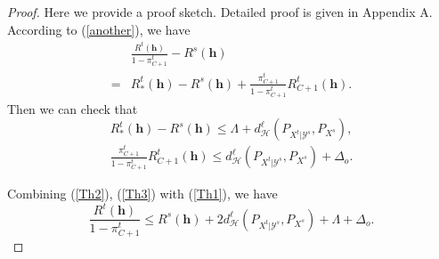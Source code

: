 \documentclass[journal]{IEEEtran}
\begin{document}
\begin{proof}
{Here we provide a proof sketch. Detailed proof is given in Appendix A.} {According to} (\ref{another}), {we have}
\begin{equation}\label{Th1}
\begin{split}
    &\frac{R^t({\bm h})}{1-\pi_{C+1}^t}-R^s({\bm h})\\=&R^t_*({\bm h})-R^s({\bm h})+\frac{\pi_{C+1}^t}{1-\pi_{C+1}^t}R^t_{C+1}({\bm h}).
\end{split}
\end{equation}
{Then we can check that }
\begin{equation}\label{Th2}
   R^t_{*}({\bm h})-R^s({\bm h})\leq\Lambda +d_{\mathcal{H}}^{\ell}(P_{X^t|\mathcal{Y}^s},P_{X^s}), 
\end{equation}
 \begin{equation}\label{Th3}
 \begin{split}
     \frac{\pi_{C+1}^t}{1-\pi_{C+1}^t}R^t_{C+1}({\bm h})\leq  {d_{\mathcal{H}}^{\ell}(P_{X^t|\mathcal{Y}^s},P_{X^s})}+\Delta_o.
     \end{split}
 \end{equation}


 
{Combining}  (\ref{Th2}),  (\ref{Th3}) {with} (\ref{Th1}), {we have}
 \begin{equation*}
    \frac{R^t({\bm h})}{1-\pi_{C+1}^t}\leq   {R^s({\bm h})} +{2{d_{\mathcal{H}}^{\ell}(P_{X^t|\mathcal{Y}^s},P_{X^s})}}+\Lambda+\Delta_o.
\end{equation*}
\end{proof}
{{}}



 
 
\end{document}
